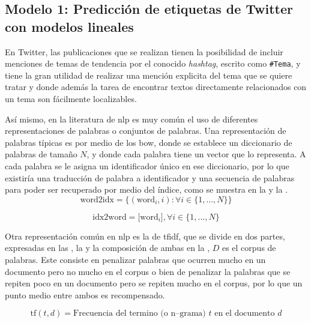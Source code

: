 \subsection{Modelo 1: Predicción de etiquetas de Twitter con modelos lineales} \label{sec:twitter-prediction}
En Twitter, las publicaciones que se realizan tienen la posibilidad de incluir menciones de temas de tendencia por el conocido \emph{hashtag}, escrito como \texttt{\#Tema}, y tiene la gran utilidad de realizar una mención explicita del tema que se quiere tratar y donde además la tarea de encontrar textos directamente relacionados con un tema son fácilmente localizables.

Así mismo, en la literatura de \gls{nlp} es muy común el uso de diferentes representaciones de palabras o conjuntos de palabras. Una representación de palabras típicas es por medio de los \gls{bow}, donde se establece un diccionario de palabras de tamaño $N$, y donde cada palabra tiene un vector que lo representa. A cada palabra se le asigna un identificador único en ese diccionario, por lo que existiría una traducción de palabra a identificador y una secuencia de palabras para poder ser recuperado por medio del índice, como se muestra en la  y la .
\begin{equation} \label{eq:bow-repr1}
  \text{word2idx} = \Big\{(\text{word}_i, i) : \forall i \in \{1, \ldots, N\} \Big\}
\end{equation}

\begin{equation} \label{eq:bow-repr2}
  \text{idx2word} = \Big[\text{word}_i\Big], \forall i \in \{1, \ldots, N\}
\end{equation}

Otra representación común en \gls{nlp} es la de \gls{tfidf}, que se divide en dos partes, expresadas en las , la  y la composición de ambas en la , $D$ es el corpus de palabras. Este consiste en penalizar palabras que ocurren mucho en un documento pero no mucho en el corpus o bien de penalizar la palabras que se repiten poco en un documento pero se repiten mucho en el corpus, por lo que un punto medio entre ambos es recompensado.

\begin{equation} \label{eq:tf-repr}
  \text{tf}(t,d) = \text{Frecuencia del termino (o n--grama) } t \text{ en el documento } d
\end{equation}

